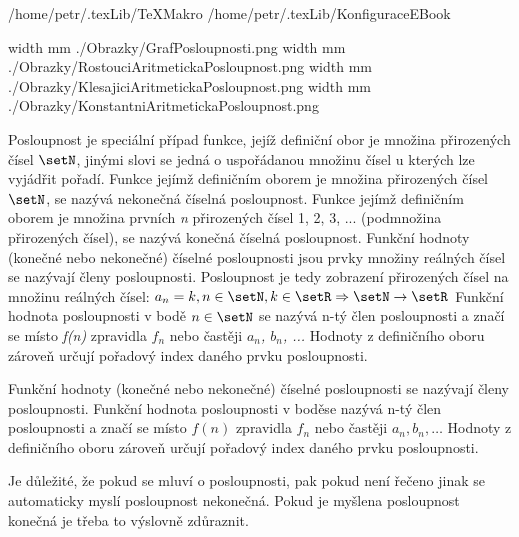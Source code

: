 \def\addr{/home/petr/.texLib}

 \addr/TeXMakro
\setAddress{\addr}
 \addr/KonfiguraceEBook


\pdfximage width \the\SirkaOdstavce mm {./Obrazky/GrafPosloupnosti.png}
\pdfximage width \the\SirkaOdstavce mm {./Obrazky/RostouciAritmetickaPosloupnost.png}
\pdfximage width \the\SirkaOdstavce mm {./Obrazky/KlesajiciAritmetickaPosloupnost.png}
\pdfximage width \the\SirkaOdstavce mm {./Obrazky/KonstantniAritmetickaPosloupnost.png}



\Obsah



Posloupnost je speciální případ funkce, jejíž definiční obor je množina přirozených čísel $\setN$, jinými slovi se jedná o uspořádanou množinu čísel u kterých lze vyjádřit pořadí.  Funkce jejímž definičním oborem je množina přirozených čísel $\setN$, se nazývá nekonečná číselná posloupnost. Funkce jejímž definičním oborem je množina prvních {\it n} přirozených čísel {1, 2, 3, ...} (podmnožina přirozených čísel), se nazývá konečná číselná posloupnost. Funkční hodnoty (konečné nebo nekonečné) číselné posloupnosti jsou prvky množiny reálných čísel se nazývají členy posloupnosti. Posloupnost je tedy zobrazení přirozených čísel na množinu reálných čísel: $a_n = k, n \in \setN, k \in \setR \Rightarrow \setN \rightarrow \setR $ Funkční hodnota posloupnosti v bodě $n \in \setN $ se nazývá n-tý člen posloupnosti a značí se místo {\it f(n)} zpravidla {\it $f_n$} nebo častěji  {\it $a_n$, $b_n$, ... } Hodnoty z definičního oboru zároveň určují pořadový index daného prvku posloupnosti. 

Funkční hodnoty (konečné nebo nekonečné) číselné posloupnosti se nazývají členy posloupnosti. Funkční hodnota posloupnosti v boděse nazývá n-tý člen posloupnosti a značí se místo $f(n)$ zpravidla $f_n$ nebo častěji $a_n, b_n, …$ Hodnoty z definičního oboru zároveň určují pořadový index daného prvku posloupnosti. 



Je důležité, že pokud se mluví o posloupnosti, pak pokud není řečeno jinak se automaticky myslí posloupnost nekonečná. Pokud je myšlena posloupnost konečná je třeba to výslovně zdůraznit.

